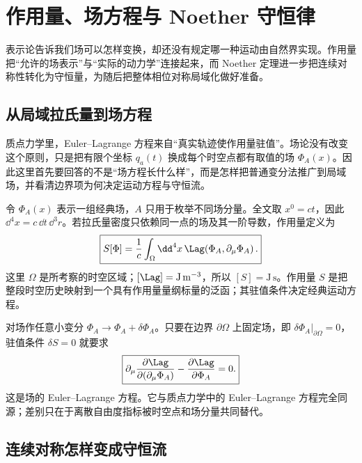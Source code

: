
\section{作用量、场方程与 Noether 守恒律}\label{sec:action-noether-dp61}

表示论告诉我们场可以怎样变换，却还没有规定哪一种运动由自然界实现。作用量把“允许的场表示”与“实际的动力学”连接起来，而 Noether 定理进一步把连续对称性转化为守恒量，为随后把整体相位对称局域化做好准备。

\subsection{从局域拉氏量到场方程}

质点力学里，Euler--Lagrange 方程来自“真实轨迹使作用量驻值”。场论没有改变这个原则，只是把有限个坐标 \(q_a(t)\) 换成每个时空点都有取值的场 \(\Phi_A(x)\)。因此这里首先要回答的不是“场方程长什么样”，而是怎样把普通变分法推广到局域场，并看清边界项为何决定运动方程与守恒流。

令 $\Phi_A(x)$ 表示一组经典场，$A$ 只用于枚举不同场分量。全文取 $x^0=ct$，因此 $\dd^4 x=c\,\dd t\,\dd^3 r$。若拉氏量密度只依赖同一点的场及其一阶导数，作用量定义为
\begin{equation}
 \boxed{
 S[\Phi]=\frac1c\int_{\Omega}\dd^4 x\,
 \Lag\!\left(\Phi_A,\partial_\mu\Phi_A\right).}
 \label{eq:field-action-general-dp61}
\end{equation}
这里 $\Omega$ 是所考察的时空区域；$[\Lag]=\mathrm{J\,m^{-3}}$，所以 $[S]=\mathrm{J\,s}$。作用量 $S$ 是把整段时空历史映射到一个具有作用量量纲标量的泛函；其驻值条件决定经典运动方程。

对场作任意小变分 $\Phi_A\to\Phi_A+\delta\Phi_A$。只要在边界 $\partial\Omega$ 上固定场，即 $\delta\Phi_A|_{\partial\Omega}=0$，驻值条件 $\delta S=0$ 就要求
\begin{equation}
 \boxed{
 \partial_\mu\frac{\partial\Lag}{\partial(\partial_\mu\Phi_A)}
 -\frac{\partial\Lag}{\partial\Phi_A}=0.}
 \label{eq:field-euler-lagrange-dp61}
\end{equation}
这是场的 Euler--Lagrange 方程。它与质点力学中的 Euler--Lagrange 方程完全同源；差别只在于离散自由度指标被时空点和场分量共同替代。

\subsection{连续对称怎样变成守恒流}

